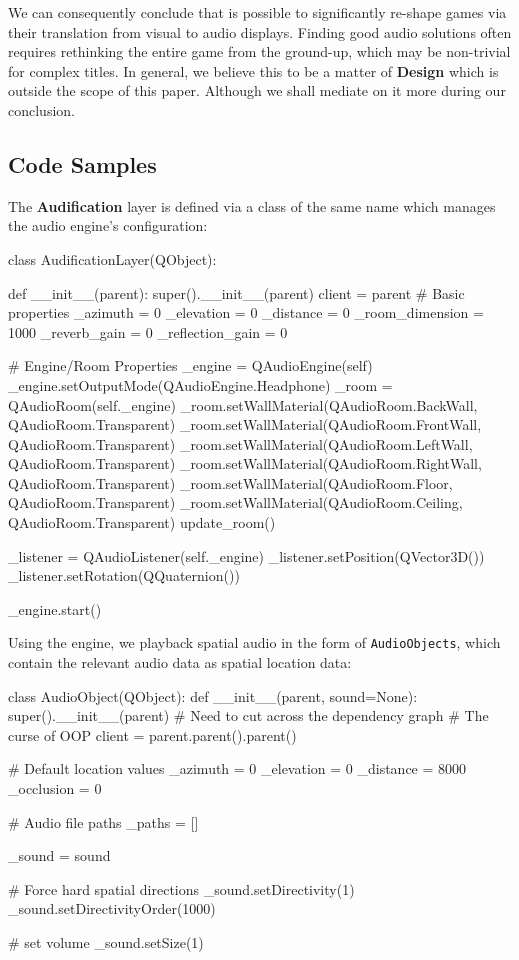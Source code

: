 \documentclass{report}
\newcommand{\design}{\textbf{Design}\xspace}
\newcommand{\audio}{\textbf{Audification}\xspace}
\begin{document}
We can consequently conclude that is possible to significantly re-shape games via their translation from visual to audio displays. Finding good audio solutions often requires rethinking the entire game from the ground-up, which may be non-trivial for complex titles. In general, we believe this to be a matter of \design which is outside the scope of this paper. Although we shall mediate on it more during our conclusion.

\subsection{Code Samples}
The \audio layer is defined via a class of the same name which manages the audio engine's configuration:

\begin{codeblock}
class AudificationLayer(QObject):

    def __init__(parent):
        super().__init__(parent)
        client = parent
        # Basic properties
        _azimuth = 0
        _elevation = 0
        _distance = 0
        _room_dimension = 1000
        _reverb_gain = 0
        _reflection_gain = 0

        # Engine/Room Properties
        _engine = QAudioEngine(self)
        _engine.setOutputMode(QAudioEngine.Headphone)
        _room = QAudioRoom(self._engine)
        _room.setWallMaterial(QAudioRoom.BackWall, QAudioRoom.Transparent)
        _room.setWallMaterial(QAudioRoom.FrontWall, QAudioRoom.Transparent)
        _room.setWallMaterial(QAudioRoom.LeftWall, QAudioRoom.Transparent)
        _room.setWallMaterial(QAudioRoom.RightWall, QAudioRoom.Transparent)
        _room.setWallMaterial(QAudioRoom.Floor, QAudioRoom.Transparent)
        _room.setWallMaterial(QAudioRoom.Ceiling, QAudioRoom.Transparent)
        update_room()

        _listener = QAudioListener(self._engine)
        _listener.setPosition(QVector3D())
        _listener.setRotation(QQuaternion())

        _engine.start()

\end{codeblock}

Using the engine, we playback spatial audio in the form of \texttt{AudioObjects}, which contain the relevant audio data as spatial location data:

\begin{codeblock}
class AudioObject(QObject):
    def __init__(parent, sound=None):
        super().__init__(parent)
        # Need to cut across the dependency graph
        # The curse of OOP
        client = parent.parent().parent()

        # Default location values
        _azimuth = 0
        _elevation = 0
        _distance = 8000
        _occlusion = 0

        # Audio file paths
        _paths = []
        
        _sound = sound
        
        # Force hard spatial directions
        _sound.setDirectivity(1)
        _sound.setDirectivityOrder(1000)
        
        # set volume
        _sound.setSize(1)
\end{codeblock}
\end{document}
